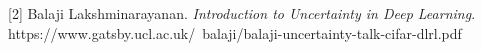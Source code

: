 \documentclass[preview]{standalone}
\begin{document}
\begin{center}
[2] Balaji Lakshminarayanan. \textit{Introduction to Uncertainty in Deep Learning}.\\https://www.gatsby.ucl.ac.uk/~balaji/balaji-uncertainty-talk-cifar-dlrl.pdf
\end{center}
\end{document}
